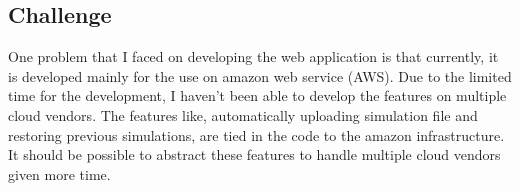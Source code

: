 \subsection{Challenge}

One problem that I faced on developing the web application is that currently, it is developed mainly for the use on amazon web service (AWS). Due to the limited time for the development, I haven't been able to develop the features on multiple cloud vendors. The features like, automatically uploading simulation file and restoring previous simulations, are tied in the code to the amazon infrastructure. It should be possible to abstract these features to handle multiple cloud vendors given more time.


